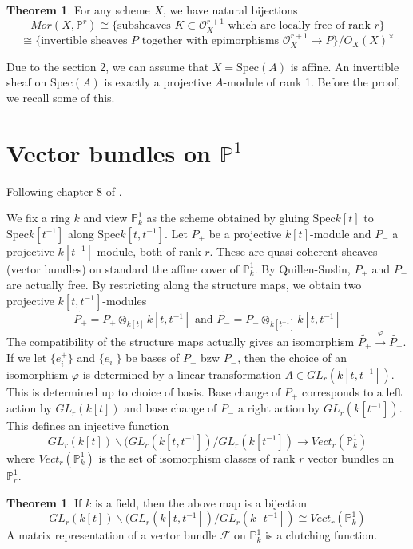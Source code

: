 \documentclass[letterpaper,10pt,twoside]{amsart}
\theoremstyle{proposition}
\theoremstyle{definition}
\theoremstyle{theorem}
\newtheorem{theorem}[proposition]{Theorem}
\theoremstyle{definition}
\theoremstyle{definition}
\theoremstyle{definition}
\theoremstyle{lemma}
\theoremstyle{definition}
\theoremstyle{definition}
\theoremstyle{corollary}
\theoremstyle{definition}
\def\Spec{\text{Spec}}
\def\O{\mathcal{O}}
\def\P{\mathbb{P}}
\def\F{\mathcal{F}}
\begin{document}
\begin{theorem}\cite{EH}
    For any scheme $X$, we have natural bijections \[Mor(X,\P^r)\cong\{\text{subsheaves }K\subset \O_X^{r+1} \text{ which are locally free of rank }r\}\]
    \[\cong\{\text{invertible sheaves }P \text{ together with epimorphisms }\O_X^{r+1}\to P\}/O_X(X)^\times\]
\end{theorem}
Due to the section 2, we can assume that $X=\Spec(A)$ is affine. An invertible sheaf on $\Spec(A)$ is exactly a projective $A$-module of rank 1. Before the proof, we recall some of this.

\section{Vector bundles on $\mathbb{P}^1$}

Following chapter 8 of \cite{1}.

We fix a ring $k$ and view $\P^1_k$ as the scheme obtained by gluing $\Spec k[t]$ to $\Spec k[t^{-1}]$ along $\Spec k[t,t^{-1}]$. Let $P_+$ be a projective $k[t]$-module and $P_-$ a projective $k[t^{-1}]$-module, both of rank $r$. These are quasi-coherent sheaves (vector bundles) on standard the affine cover of $\P^1_k$. By Quillen-Suslin, $P_+$ and $P_-$ are actually free. By restricting along the structure maps, we obtain two projective $k[t,t^{-1}]$-modules \[\widetilde{P_+}= P_+\otimes_{k[t]}k[t,t^{-1}] \text{ and } \widetilde{P_-}=P_-\otimes_{k[t^{-1}]}k[t,t^{-1}]\] The compatibility of the structure maps actually gives an isomorphism $\widetilde{P_+}\xrightarrow{\varphi} \widetilde{P_-}$. If we let $\{e_i^+\}$ and $\{e_i^-\}$ be bases of $P_+$ bzw $P_-$, then the choice of an isomorphism $\varphi$ is determined by a linear transformation $A \in GL_r(k[t,t^{-1}])$. This is determined up to choice of basis. Base change of $P_+$ corresponds to a left action by $GL_r(k[t])$ and base change of $P_-$ a right action by $GL_r(k[t^{-1}])$. This defines an injective function \[GL_r(k[t])\backslash(GL_r(k[t,t^{-1}])/GL_r(k[t^{-1}]) \to Vect_r(\P^1_k)\] where $Vect_r(\P^1_k)$ is the set of isomorphism classes of rank $r$ vector bundles on $\P^1_r$.

\begin{theorem}\cite{1}
    If $k$ is a field, then the above map is a bijection \[GL_r(k[t])\backslash(GL_r(k[t,t^{-1}])/GL_r(k[t^{-1}]) \cong Vect_r(\P^1_k)\] A matrix representation of a vector bundle $\F$ on $\P^1_k$ is a clutching function.
\end{theorem}
\end{document}
